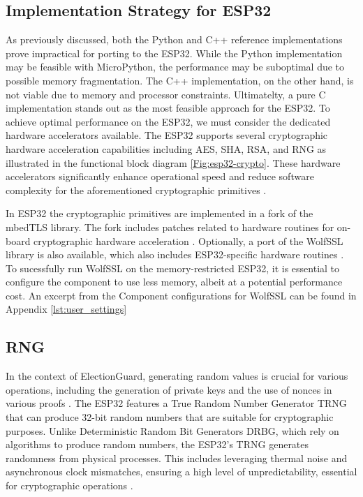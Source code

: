 \subsection{Implementation Strategy for ESP32}
As previously discussed, both the Python and C++ reference implementations prove impractical for porting to the ESP32. While the Python implementation may be feasible with MicroPython, the performance may be suboptimal due to possible memory fragmentation. The C++ implementation, on the other hand, is not viable due to memory and processor constraints. Ultimatelty, a pure C implementation stands out as the most feasible approach for the ESP32. To achieve optimal performance on the ESP32, we must consider the dedicated hardware accelerators available. The ESP32 supports several cryptographic hardware acceleration capabilities including AES, SHA, RSA, and RNG as illustrated in the functional block diagram \ref{Fig:esp32-crypto}. These hardware accelerators significantly enhance operational speed and reduce software complexity for the aforementioned cryptographic primitives \cite[32]{esp32-series}. 

In ESP32 the cryptographic primitives are implemented in a fork of the mbedTLS library. The fork includes patches related to hardware routines for on-board cryptographic hardware acceleration \cite{esp32-ref}. Optionally, a port of the WolfSSL library is also available, which also includes ESP32-specific hardware routines \cite[114]{wolfSSL-manual}. To sucessfully run WolfSSL on the memory-restricted ESP32, it is essential to configure the component to use less memory, albeit at a potential performance cost. An excerpt from the Component configurations for WolfSSL can be found in Appendix \ref{lst:user_settings}

\subsection{\ac{RNG}}
In the context of ElectionGuard, generating random values is crucial for various operations, including the generation of private keys and the use of nonces in various proofs \cite[9, 13]{eg-spec}. The ESP32 features a True Random Number Generator \ac{TRNG} that can produce 32-bit random numbers that are suitable for cryptographic purposes. Unlike Deterministic Random Bit Generators \ac{DRBG}, which rely on algorithms to produce random numbers, the ESP32's \ac{TRNG} generates randomness from physical processes. This includes leveraging thermal noise and asynchronous clock mismatches, ensuring a high level of unpredictability, essential for cryptographic operations \cite[604]{esp32-ref}.

